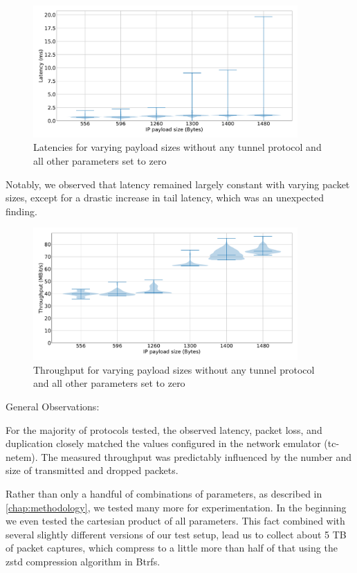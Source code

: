 \begin{figure}[tbh]
	\centering
	\includegraphics[draft=false,width=0.9\textwidth]{figures/Graphs/graph-1-mtu/latencies.pdf}
	\caption{Latencies for varying payload sizes without any tunnel protocol and all other parameters set to zero}
	\label{fig:graph-1-mtu-latencies}
\end{figure}

Notably, we observed that latency remained largely constant with varying packet sizes, except for a drastic increase in tail latency, which was an unexpected finding.

\begin{figure}[tbh]
	\centering
	\includegraphics[draft=false,width=0.9\textwidth]{figures/Graphs/graph-1-mtu/throughput.pdf}
	\caption{Throughput for varying payload sizes without any tunnel protocol and all other parameters set to zero}
	\label{fig:graph-1-mtu-throughput}
\end{figure}





General Observations:

For the majority of protocols tested, the observed latency, packet loss, and duplication closely matched the values configured in the network emulator (tc-netem).
The measured throughput was predictably influenced by the number and size of transmitted and dropped packets.



Rather than only a handful of combinations of parameters, as described in \cref{chap:methodology}, we tested many more for experimentation.
In the beginning we even tested the cartesian product of all parameters.
This fact combined with several slightly different versions of our test setup, lead us to collect about 5 TB of packet captures, which compress to a little more than half of that using the zstd compression algorithm in Btrfs.
